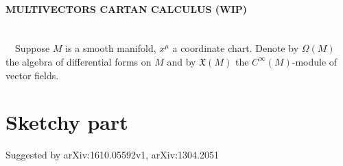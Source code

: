\documentclass[a4paper,12pt]{scrartcl}
\begin{document}
  \begin{landscape}
    \thispagestyle{empty}
    \noindent
    \paragraph{MULTIVECTORS CARTAN CALCULUS (WIP)}
    	\mbox{}\\
        $\quad$Suppose $M$ is a smooth manifold, $x^\mu$ a coordinate chart. Denote by $\Omega(M)$ the algebra of differential forms on $M$ and by $\mathfrak{X}(M)$ the $C^\infty(M)$-module of vector fields.  \\

  \end{landscape}
  
  \section{Sketchy part}
  	Suggested by arXiv:1610.05592v1,  arXiv:1304.2051
\end{document}
